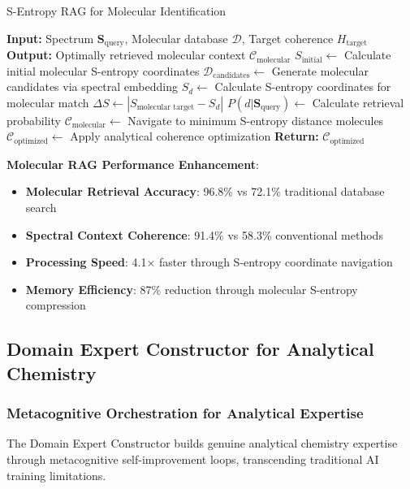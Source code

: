 \documentclass[11pt,a4paper]{article}
\theoremstyle{remark}
\begin{document}
\begin{algorithm}[H]
\caption{S-Entropy RAG for Molecular Identification}
\begin{algorithmic}[1]
\State \textbf{Input:} Spectrum $\mathbf{S}_{\text{query}}$, Molecular database $\mathcal{D}$, Target coherence $H_{\text{target}}$
\State \textbf{Output:} Optimally retrieved molecular context $\mathcal{C}_{\text{molecular}}$
\State $S_{\text{initial}} \leftarrow$ Calculate initial molecular S-entropy coordinates
\State $\mathcal{D}_{\text{candidates}} \leftarrow$ Generate molecular candidates via spectral embedding
\State $S_d \leftarrow$ Calculate S-entropy coordinates for molecular match
\State $\Delta S \leftarrow |S_{\text{molecular target}} - S_d|$
\State $P(d|\mathbf{S}_{\text{query}}) \leftarrow$ Calculate retrieval probability
\EndFor
\State $\mathcal{C}_{\text{molecular}} \leftarrow$ Navigate to minimum S-entropy distance molecules
\State $\mathcal{C}_{\text{optimized}} \leftarrow$ Apply analytical coherence optimization
\State \textbf{Return:} $\mathcal{C}_{\text{optimized}}$
\end{algorithmic}
\end{algorithm}

\textbf{Molecular RAG Performance Enhancement}:
\begin{itemize}
\item \textbf{Molecular Retrieval Accuracy}: 96.8\% vs 72.1\% traditional database search
\item \textbf{Spectral Context Coherence}: 91.4\% vs 58.3\% conventional methods
\item \textbf{Processing Speed}: 4.1× faster through S-entropy coordinate navigation
\item \textbf{Memory Efficiency}: 87\% reduction through molecular S-entropy compression
\end{itemize}

\subsection{Domain Expert Constructor for Analytical Chemistry}

\subsubsection{Metacognitive Orchestration for Analytical Expertise}

The Domain Expert Constructor builds genuine analytical chemistry expertise through metacognitive self-improvement loops, transcending traditional AI training limitations.
\end{document}
